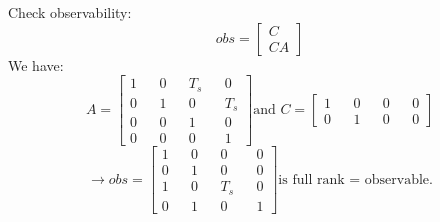 	Check observability:
	\[obs = 
	\begin{bmatrix}
		C  \\
		CA 
	\end{bmatrix}\]
	We have:
	\[A = 
	\begin{bmatrix}
		1 &   & 0 &   & T_s &   & 0   \\
		0 &   & 1 &   & 0   &   & T_s \\
		0 &   & 0 &   & 1   &   & 0   \\
		0 &   & 0 &   & 0   &   & 1   
	\end{bmatrix} \text{and } C = 
	\begin{bmatrix}
		1 &   & 0 &   & 0 &   & 0 \\
		0 &   & 1 &   & 0 &   & 0 
	\end{bmatrix}\]
	\[\rightarrow obs = 
	\begin{bmatrix}
		1 &   & 0 &   & 0   &   & 0 \\
		0 &   & 1 &   & 0   &   & 0 \\
		1 &   & 0 &   & T_s &   & 0 \\
		0 &   & 1 &   & 0   &   & 1 
	\end{bmatrix} \text{is full rank = observable.}\]
